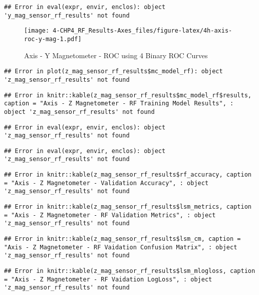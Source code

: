 \documentclass[]{article}
\begin{document}
\begin{verbatim}
## Error in eval(expr, envir, enclos): object 'y_mag_sensor_rf_results' not found
\end{verbatim}

\begin{figure}
\centering
\texttt{[image: 4-CHP4\_RF\_Results-Axes\_files/figure-latex/4h-axis-roc-y-mag-1.pdf]}
\caption{Axis - Y Magnetometer - ROC using 4 Binary ROC Curves}
\end{figure}

\begin{verbatim}
## Error in plot(z_mag_sensor_rf_results$mc_model_rf): object 'z_mag_sensor_rf_results' not found
\end{verbatim}

\begin{verbatim}
## Error in knitr::kable(z_mag_sensor_rf_results$mc_model_rf$results, caption = "Axis - Z Magnetometer - RF Training Model Results", : object 'z_mag_sensor_rf_results' not found
\end{verbatim}

\begin{verbatim}
## Error in eval(expr, envir, enclos): object 'z_mag_sensor_rf_results' not found
\end{verbatim}

\begin{verbatim}
## Error in eval(expr, envir, enclos): object 'z_mag_sensor_rf_results' not found
\end{verbatim}

\begin{verbatim}
## Error in knitr::kable(z_mag_sensor_rf_results$rf_accuracy, caption = "Axis - Z Magnetometer - Validation Accuracy", : object 'z_mag_sensor_rf_results' not found
\end{verbatim}

\begin{verbatim}
## Error in knitr::kable(z_mag_sensor_rf_results$lsm_metrics, caption = "Axis - Z Magnetometer - RF Validation Metrics", : object 'z_mag_sensor_rf_results' not found
\end{verbatim}

\begin{verbatim}
## Error in knitr::kable(z_mag_sensor_rf_results$lsm_cm, caption = "Axis - Z Magnetometer - RF Vaidation Confusion Matrix", : object 'z_mag_sensor_rf_results' not found
\end{verbatim}

\begin{verbatim}
## Error in knitr::kable(z_mag_sensor_rf_results$lsm_mlogloss, caption = "Axis - Z Magnetometer - RF Vaidation LogLoss", : object 'z_mag_sensor_rf_results' not found
\end{verbatim}
\end{document}
